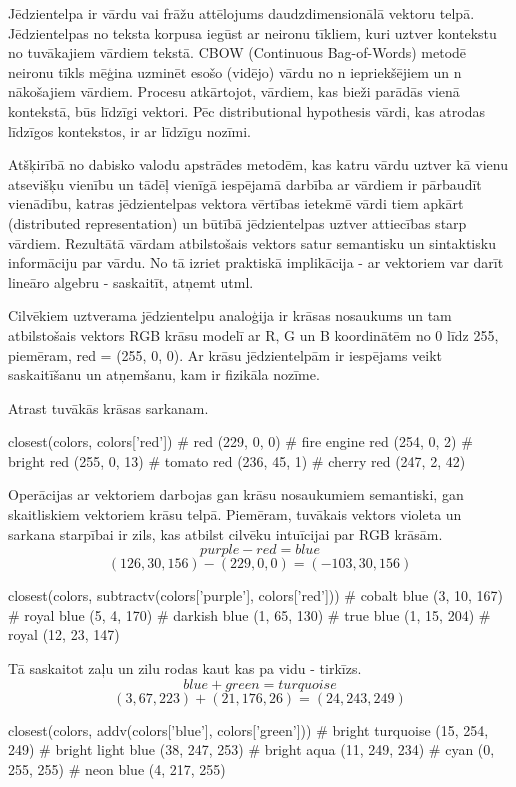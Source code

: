 Jēdzientelpa ir vārdu vai frāžu attēlojums daudzdimensionālā vektoru telpā. Jēdzientelpas no teksta korpusa iegūst ar neironu tīkliem, kuri uztver kontekstu no tuvākajiem vārdiem tekstā. CBOW (Continuous Bag-of-Words) metodē neironu tīkls mēģina uzminēt esošo (vidējo) vārdu no n iepriekšējiem un n nākošajiem vārdiem. Procesu atkārtojot, vārdiem, kas bieži parādās vienā kontekstā, būs līdzīgi vektori. Pēc distributional hypothesis vārdi, kas atrodas līdzīgos kontekstos, ir ar līdzīgu nozīmi.

Atšķirībā no dabisko valodu apstrādes metodēm, kas katru vārdu uztver kā vienu atsevišķu vienību un tādēļ vienīgā iespējamā darbība ar vārdiem ir pārbaudīt vienādību, katras jēdzientelpas vektora vērtības ietekmē vārdi tiem apkārt (distributed representation) un būtībā jēdzientelpas uztver attiecības starp vārdiem. Rezultātā vārdam atbilstošais vektors satur semantisku un sintaktisku informāciju par vārdu. No tā izriet praktiskā implikācija - ar vektoriem var darīt lineāro algebru - saskaitīt, atņemt utml.

Cilvēkiem uztverama jēdzientelpu analoģija ir krāsas nosaukums un tam atbilstošais vektors RGB krāsu modelī ar R, G un B koordinātēm no 0 līdz 255, piemēram, red = (255, 0, 0). Ar krāsu jēdzientelpām ir iespējams veikt saskaitīšanu un atņemšanu, kam ir fizikāla nozīme.

Atrast tuvākās krāsas sarkanam.
\begin{python}
closest(colors, colors['red'])
# red (229, 0, 0)
# fire engine red (254, 0, 2)
# bright red (255, 0, 13)
# tomato red (236, 45, 1)
# cherry red (247, 2, 42)
\end{python}

Operācijas ar vektoriem darbojas gan krāsu nosaukumiem semantiski, gan skaitliskiem vektoriem krāsu telpā. Piemēram, tuvākais vektors violeta un sarkana starpībai ir zils, kas atbilst cilvēku intuīcijai par RGB krāsām.
$$purple - red = blue$$
$$(126, 30, 156) - (229, 0, 0) = (-103, 30, 156)$$
\begin{python}
closest(colors, subtractv(colors['purple'], colors['red']))
# cobalt blue (3, 10, 167)
# royal blue (5, 4, 170)
# darkish blue (1, 65, 130)
# true blue (1, 15, 204)
# royal (12, 23, 147)
\end{python}

Tā saskaitot zaļu un zilu rodas kaut kas pa vidu - tirkīzs.
$$blue + green = turquoise$$
$$(3, 67, 223) + (21, 176, 26) = (24, 243, 249)$$
\begin{python}
closest(colors, addv(colors['blue'], colors['green']))
# bright turquoise (15, 254, 249)
# bright light blue (38, 247, 253)
# bright aqua (11, 249, 234)
# cyan (0, 255, 255)
# neon blue (4, 217, 255)
\end{python}

